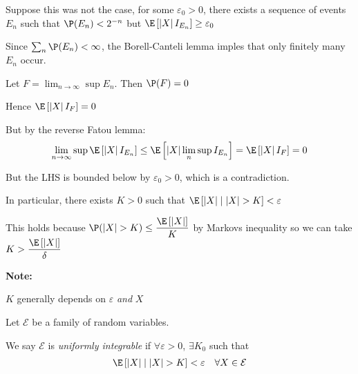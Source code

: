\begin{prf}[]{}
  Suppose this was not the case, for some $\varepsilon_0>0$, there exists a sequence of events $E_n$ such that $\P(E_n)<2^{-n}$ but $\E\left[\left|X\right|I_{E_n}\right]\geq \varepsilon_0$\par
  \noindent Since $\sum_n \P(E_n)<\infty$, the Borell-Canteli lemma imples that only finitely many $E_n$ occur.
  \par\bigskip
  \noindent Let $F = \lim_{n\to\infty}\sup E_n$. Then $\P(F) = 0$\par
  \noindent Hence $\E\left[\left|X\right|I_F\right] = 0$\par
  \noindent But by the reverse Fatou lemma:
  \begin{equation*}
    \begin{gathered}
      \lim_{n\to\infty}\sup \E\left[\left|X\right|I_{E_n}\right]\leq\E\left[\left|X\right|\lim_n\sup I_{E_n}\right] = \E\left[\left|X\right|I_F\right]=0
    \end{gathered}
  \end{equation*}\par
  \noindent But the LHS is bounded below by $\varepsilon_0>0$, which is a contradiction.
\end{prf}
\par\bigskip
\noindent In particular, there exists $K>0$ such that $\E\left[\left|X\right|\mid\left|X\right|>K\right]<\varepsilon$\par
\noindent This holds because $\P(\left|X\right|>K)\leq \dfrac{\E\left[\left|X\right|\right]}{K}$ by Markovs inequality so we can take $K>\dfrac{\E\left[\left|X\right|\right]}{\delta}$
\par\bigskip
\noindent\textbf{Note:}\par
\noindent $K$ generally depends on $\varepsilon$ \textit{and} $X$
\par\bigskip
\begin{defo}{}
  Let $\mathcal{E}$ be a family of random variables. \par
  \noindent We say $\mathcal{E}$ is \textit{uniformly integrable} if $\forall \varepsilon>0$, $\exists K_0$ such that 
  \begin{equation*}
    \begin{gathered}
      \E\left[\left|X\right|\mid\left|X\right|>K\right]<\varepsilon\quad\forall X\in\mathcal{E}
    \end{gathered}
  \end{equation*}
\end{defo}
